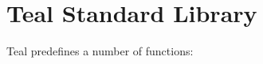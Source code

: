 \documentclass{article}
\begin{document}



\section{Teal Standard Library}

Teal predefines a number of functions:
\end{document}
